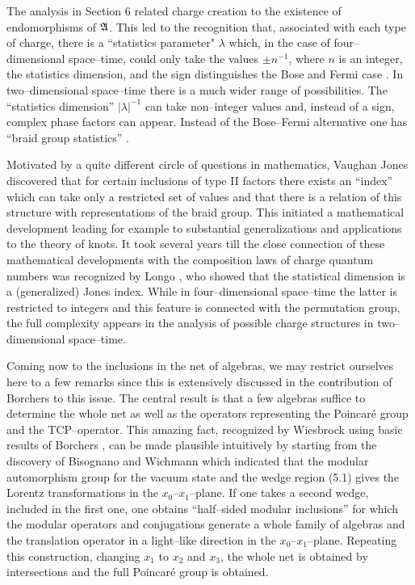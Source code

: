 The analysis in Section 6 related charge creation to the existence of
endomorphisms of ${\mathfrak A}$. This led to the recognition that,
associated with each type of charge, there is a ``statistics parameter"
$\lambda$ which, in the case of 
four--dimensional space--time, could only
take the values $\pm n^{-1}$, where $n$ is an integer,
the statistics dimension, and the sign
distinguishes the Bose and Fermi case \cite{DoHaRo}. 
In two--dimensional space--time
there is a much wider range of possibilities. The ``statistics
dimension'' $|\lambda|^{-1}$ can take non--integer values and, instead
of a sign, complex phase factors can appear. Instead of the Bose--Fermi
alternative one has ``braid group statistics'' \cite{FrReSch}.

Motivated by a quite different circle of questions in mathematics, 
Vaughan Jones discovered that for certain inclusions of type
II factors there exists an ``index'' which can take only a restricted
set of values and that there is a relation of this structure with
representations of the braid group. This initiated a mathematical
development leading for example 
to substantial generalizations and applications to
the theory of knots. It took several years till the close connection
of these mathematical developments with the composition laws of charge
quantum numbers was recognized by Longo \cite{Lo}, who showed that 
the statistical  dimension is a 
(generalized) Jones index. While in
four--dimensional space--time the latter is restricted to integers and this
feature is connected with the permutation group, the full complexity
appears in the analysis of possible charge structures in two--dimensional
space--time.

Coming now to the inclusions in the net of algebras, we may restrict
ourselves here to a few remarks since this is extensively discussed in
the contribution of Borchers to this issue. The central result is that
a few algebras suffice to determine the whole net as well as the operators
representing the Poincar\'e  group and the TCP--operator. This amazing
fact, recognized by Wiesbrock 
\cite{Wi,KaWi} using basic results of Borchers
\cite{Bo2},  can be made plausible intuitively by starting from the
discovery of Bisognano and Wichmann \cite{BiWi} which indicated that the
modular automorphism group for the vacuum state and the wedge region
(5.1) gives the Lorentz transformations in the $x_0$--$x_1$--plane. If one
takes a second wedge, included in the first one, one obtains
``half--sided modular inclusions'' for which the modular
operators and conjugations generate a whole family of algebras and the
translation operator in a light--like direction in the
$x_0$--$x_1$--plane. Repeating this construction, changing $x_1$ to $x_2$ and
$x_3$, the whole net is obtained by intersections and the full
Poincar\'e group is obtained.


